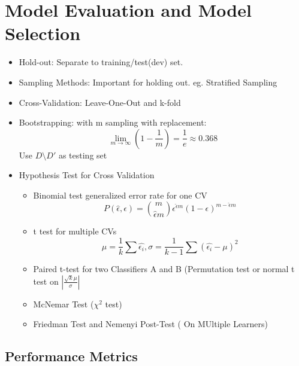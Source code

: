 \documentclass[11pt, openany]{book}              %
\begin{document}
\chapter{Model Evaluation and Model Selection}

\begin{itemize}
    \item Hold-out: Separate to training/test(dev) set.
    \item Sampling Methods: Important for holding out. eg. Stratified Sampling
    \item Cross-Validation: Leave-One-Out and k-fold
    \item Bootstrapping: with m sampling with replacement:
    $$ \lim_{m \to \infty} (1-\frac{1}{m}) = \frac{1}{e} \approx 0.368$$ Use $D \setminus D'$ as testing set
    \item Hypothesis Test for Cross Validation
     \begin{itemize}
     \item Binomial test generalized error rate for one CV
    $$P(\hat{\epsilon}, \epsilon) = {m\choose \hat{\epsilon} m} \epsilon^{\hat{\epsilon} m}(1-\epsilon)^{m-\hat{\epsilon}m}$$ 
     \item t test for multiple CVs
    $$\mu = \frac{1}{k} \sum \hat{\epsilon_i}, \sigma = \frac{1}{k-1}\sum (\hat{\epsilon_i} - \mu )^2$$ 
    \item Paired t-test for two Classifiers A and B (Permutation test or normal t test on $|\frac{\sqrt{k}\mu}{\sigma}|$
    \item McNemar Test ($\chi^2$ test)
    \item Friedman Test and Nemenyi Post-Test ( On MUltiple Learners)
    \end{itemize}
\end{itemize}


\section{Performance Metrics}
\end{document}

